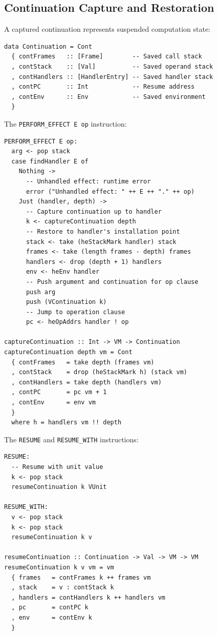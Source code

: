 \subsection{Continuation Capture and Restoration}
\label{subsec:continuation-capture}

\begin{definition}
\label{def:continuation-structure}
A captured continuation represents suspended computation state:
\begin{verbatim}
data Continuation = Cont
  { contFrames   :: [Frame]        -- Saved call stack
  , contStack    :: [Val]          -- Saved operand stack
  , contHandlers :: [HandlerEntry] -- Saved handler stack
  , contPC       :: Int            -- Resume address
  , contEnv      :: Env            -- Saved environment
  }
\end{verbatim}
\end{definition}

\begin{definition}
\label{def:perform-effect-semantics}
The \texttt{PERFORM\_EFFECT E op} instruction:
\begin{verbatim}
PERFORM_EFFECT E op:
  arg <- pop stack
  case findHandler E of
    Nothing ->
      -- Unhandled effect: runtime error
      error ("Unhandled effect: " ++ E ++ "." ++ op)
    Just (handler, depth) ->
      -- Capture continuation up to handler
      k <- captureContinuation depth
      -- Restore to handler's installation point
      stack <- take (heStackMark handler) stack
      frames <- take (length frames - depth) frames
      handlers <- drop (depth + 1) handlers
      env <- heEnv handler
      -- Push argument and continuation for op clause
      push arg
      push (VContinuation k)
      -- Jump to operation clause
      pc <- heOpAddrs handler ! op

captureContinuation :: Int -> VM -> Continuation
captureContinuation depth vm = Cont
  { contFrames   = take depth (frames vm)
  , contStack    = drop (heStackMark h) (stack vm)
  , contHandlers = take depth (handlers vm)
  , contPC       = pc vm + 1
  , contEnv      = env vm
  }
  where h = handlers vm !! depth
\end{verbatim}
\end{definition}

\begin{definition}
\label{def:resume-semantics}
The \texttt{RESUME} and \texttt{RESUME\_WITH} instructions:
\begin{verbatim}
RESUME:
  -- Resume with unit value
  k <- pop stack
  resumeContinuation k VUnit

RESUME_WITH:
  v <- pop stack
  k <- pop stack
  resumeContinuation k v

resumeContinuation :: Continuation -> Val -> VM -> VM
resumeContinuation k v vm = vm
  { frames   = contFrames k ++ frames vm
  , stack    = v : contStack k
  , handlers = contHandlers k ++ handlers vm
  , pc       = contPC k
  , env      = contEnv k
  }
\end{verbatim}
\end{definition}

